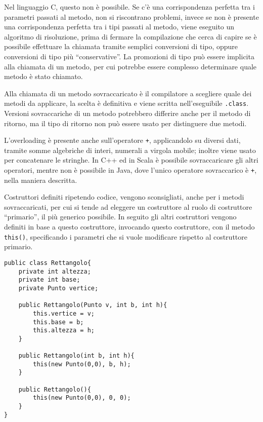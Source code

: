 \documentclass{article}
\numberwithin{equation}{subsection}
\begin{document}
Nel linguaggio C, questo non è possibile. Se c'è una corrispondenza perfetta tra i parametri passati al metodo, non si riscontrano problemi, invece se non è presente 
una corrispondenza perfetta tra i tipi passati al metodo, viene eseguito un algoritmo di risoluzione, prima di fermare la compilazione che cerca di capire se è possibile 
effettuare la chiamata tramite semplici conversioni di tipo, oppure conversioni di tipo più ``conservative''. La promozioni di tipo può essere implicita alla chiamata di un 
metodo, per cui potrebbe essere complesso determinare quale metodo è stato chiamato. 

Alla chiamata di un metodo sovraccaricato è il compilatore a scegliere quale dei metodi da applicare, la scelta è definitiva e viene scritta nell'eseguibile \verb|.class|. 
Versioni sovraccariche di un metodo potrebbero differire anche per il metodo di ritorno, ma il tipo di ritorno non può essere usato per distinguere due metodi. 

L'overloading è presente anche sull'operatore \verb|+|, applicandolo su diversi dati, tramite somme algebriche di interi, numerali a virgola mobile; inoltre viene usato per 
concatenare le stringhe. In C++ ed in Scala è possibile sovraccaricare gli altri operatori, mentre non è possibile in Java, dove l'unico operatore sovraccarico è \verb|+|, 
nella maniera descritta. 

Costruttori definiti ripetendo codice, vengono sconsigliati, anche per i metodi sovraccaricati, per cui si tende ad eleggere un costruttore al ruolo di costruttore ``primario'', 
il più generico possibile. In seguito gli altri costruttori vengono definiti in base a questo costruttore, invocando questo costruttore, con il metodo \verb|this()|, 
specificando i parametri che si vuole modificare rispetto al costruttore primario. 


\begin{verbatim}
public class Rettangolo{
    private int altezza;
    private int base;
    private Punto vertice;

    public Rettangolo(Punto v, int b, int h){
        this.vertice = v;
        this.base = b;
        this.altezza = h;
    }

    public Rettangolo(int b, int h){
        this(new Punto(0,0), b, h);
    }

    public Rettangolo(){
        this(new Punto(0,0), 0, 0);
    }
}   
\end{verbatim}
\end{document}
